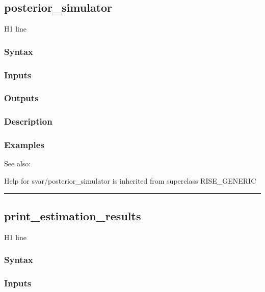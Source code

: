 \documentclass[letterpaper,10pt,english]{sphinxmanual}
\begin{document}
\subsection{posterior\_simulator}
\label{classes/models/@svar/svar:posterior-simulator}\label{classes/models/@svar/svar:id80}
H1 line


\subsubsection{Syntax}
\label{classes/models/@svar/svar:id81}

\subsubsection{Inputs}
\label{classes/models/@svar/svar:id82}

\subsubsection{Outputs}
\label{classes/models/@svar/svar:id83}

\subsubsection{Description}
\label{classes/models/@svar/svar:id84}

\subsubsection{Examples}
\label{classes/models/@svar/svar:id85}
See also:

Help for svar/posterior\_simulator is inherited from superclass RISE\_GENERIC


\bigskip\hrule{}\bigskip



\subsection{print\_estimation\_results}
\label{classes/models/@svar/svar:print-estimation-results}\label{classes/models/@svar/svar:id86}
H1 line


\subsubsection{Syntax}
\label{classes/models/@svar/svar:id87}

\subsubsection{Inputs}
\label{classes/models/@svar/svar:id88}
\end{document}

